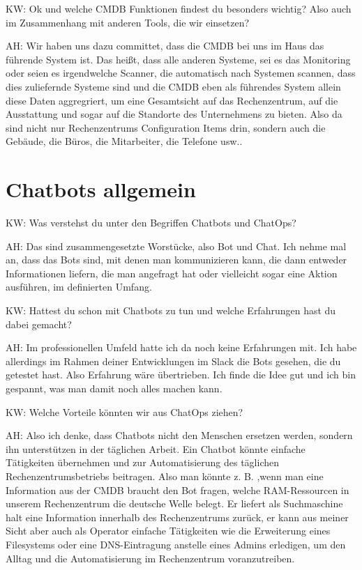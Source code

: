 \begin{list}{X:}{\setlength{\labelsep}{5mm}}
\item [KW:] Ok und welche CMDB Funktionen findest du besonders wichtig? Also auch im Zusammenhang mit anderen Tools, die wir einsetzen? 
\item [AH:] Wir haben uns dazu committet, dass die CMDB bei uns im Haus das führende System ist. Das heißt, dass alle anderen Systeme, sei es das Monitoring oder seien es irgendwelche Scanner, die automatisch nach Systemen scannen, dass dies zuliefernde Systeme sind und die CMDB eben als führendes System allein diese Daten aggregriert, um eine Gesamtsicht auf das Rechenzentrum, auf die Ausstattung und sogar auf die Standorte des Unternehmens zu bieten. Also da sind nicht nur Rechenzentrums Configuration Items drin, sondern auch die Gebäude, die Büros, die Mitarbeiter, die Telefone usw..
\end{list}

\section*{Chatbots allgemein}

\begin{list}{X:}{\setlength{\labelsep}{5mm}}
\item [KW:] Was verstehst du unter den Begriffen Chatbots und ChatOps?
\item [AH:] Das sind zusammengesetzte Worstücke, also Bot und Chat. Ich nehme mal an, dass das Bots sind, mit denen man kommunizieren kann, die dann entweder Informationen liefern, die man angefragt hat oder vielleicht sogar eine Aktion ausführen, im definierten Umfang. 
\item [KW:] Hattest du schon mit Chatbots zu tun und welche Erfahrungen hast du dabei gemacht?
\item [AH:] Im professionellen Umfeld hatte ich da noch keine Erfahrungen mit. Ich habe allerdings im Rahmen deiner Entwicklungen im Slack die Bots gesehen, die du getestet hast. Also Erfahrung wäre übertrieben. Ich finde die Idee gut und ich bin gespannt, was man damit noch alles machen kann.
\item [KW:] Welche Vorteile könnten wir aus ChatOps ziehen?
\item [AH:] Also ich denke, dass Chatbots nicht den Menschen ersetzen werden, sondern ihn unterstützen in der täglichen Arbeit. Ein Chatbot könnte einfache Tätigkeiten übernehmen und zur Automatisierung des täglichen Rechenzentrumsbetriebs beitragen. Also man könnte z. B. ,wenn man eine Information aus der CMDB braucht den Bot fragen, welche RAM-Ressourcen in unserem Rechenzentrum die deutsche Welle belegt. Er liefert als Suchmaschine halt eine Information innerhalb des Rechenzentrums zurück, er kann aus meiner Sicht aber auch als Operator einfache Tätigkeiten wie die Erweiterung eines Filesystems oder eine DNS-Eintragung anstelle eines Admins erledigen, um den Alltag und die Automatisierung im Rechenzentrum voranzutreiben.
\end{list}

